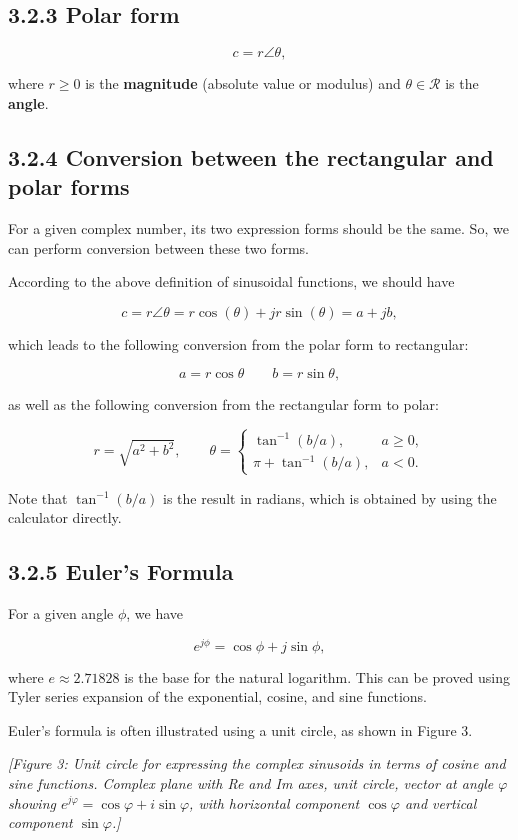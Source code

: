 \documentclass[11pt]{article}
\begin{document}
\subsection*{3.2.3 Polar form}

\[c = r \angle \theta,\]

where $r \geq 0$ is the \textbf{magnitude} (absolute value or modulus) and $\theta \in \mathcal{R}$ is the \textbf{angle}.

\subsection*{3.2.4 Conversion between the rectangular and polar forms}

For a given complex number, its two expression forms should be the same. So, we can perform conversion between these two forms.

According to the above definition of sinusoidal functions, we should have

\[c = r\angle\theta = r\cos(\theta) + jr\sin(\theta) = a + jb,\]

which leads to the following conversion from the polar form to rectangular:

\[a = r\cos\theta \qquad b = r\sin\theta,\]

as well as the following conversion from the rectangular form to polar:

\[r = \sqrt{a^2 + b^2}, \qquad \theta = \begin{cases} \tan^{-1}(b/a), & a \geq 0, \\ \pi + \tan^{-1}(b/a), & a < 0. \end{cases}\]

Note that $\tan^{-1}(b/a)$ is the result in radians, which is obtained by using the calculator directly.

\subsection*{3.2.5 Euler's Formula}

For a given angle $\phi$, we have

\[e^{j\phi} = \cos\phi + j\sin\phi,\]

where $e \approx 2.71828$ is the base for the natural logarithm. This can be proved using Tyler series expansion of the exponential, cosine, and sine functions.

Euler's formula is often illustrated using a unit circle, as shown in Figure 3.

\textit{[Figure 3: Unit circle for expressing the complex sinusoids in terms of cosine and sine functions. Complex plane with Re and Im axes, unit circle, vector at angle $\varphi$ showing $e^{j\varphi} = \cos\varphi + i\sin\varphi$, with horizontal component $\cos\varphi$ and vertical component $\sin\varphi$.]}
\end{document}
